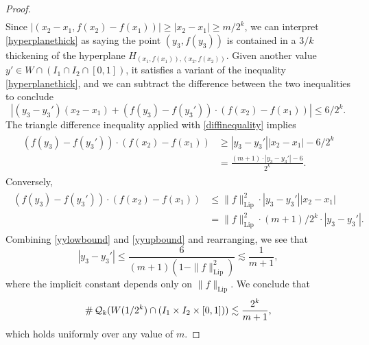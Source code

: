 \begin{proof}
\begin{align}
	\end{align}
	Since $|(x_2-x_1,f(x_2)-f(x_1))| \geq |x_2-x_1| \geq m/2^k$, we can interpret \eqref{hyperplanethick} as saying the point $(y_3, f(y_3))$ is contained in a $3/k$ thickening of the hyperplane $H_{(x_1,f(x_1)), (x_2,f(x_2))}$. Given another value $y' \in W \cap (I_1 \cap I_2 \cap [0,1])$, it satisfies a variant of the inequality \eqref{hyperplanethick}, and we can subtract the difference between the two inequalities to conclude
	\begin{equation} \label{diffinequality}
		\left| \left( y_3 - y_3' \right) (x_2 - x_1) + (f(y_3) - f(y_3')) \cdot (f(x_2) - f(x_1)) \right| \leq 6/2^k.
	\end{equation}
	The triangle difference inequality applied with \eqref{diffinequality} implies
	\begin{align} \label{yylowbound}
	\begin{split}
		(f(y_3) - f(y_3')) \cdot (f(x_2) - f(x_1)) &\geq |y_3 - y_3'||x_2-x_1| - 6/2^k\\ &= \frac{(m+1) \cdot |y_3 - y_3'| - 6}{2^k}.
	\end{split}
	\end{align}
	Conversely,
	\begin{align} \label{yyupbound}
	\begin{split}
		(f(y_3) - f(y_3')) \cdot (f(x_2) - f(x_1)) &\leq \| f \|_{\text{Lip}}^2 \cdot |y_3 - y_3'| |x_2 - x_1| \\ &=  \| f \|_{\text{Lip}}^2 \cdot (m+1)/2^k \cdot |y_3 - y_3'|.
	\end{split}
	\end{align}
	Combining \eqref{yylowbound} and \eqref{yyupbound} and rearranging, we see that
	\begin{equation}\label{y3minusY3Prime}
		|y_3 - y_3'| \leq \frac{6}{(m+1)(1 - \| f \|_{\text{Lip}}^2)}  \lesssim\frac{1}{m+1},
	\end{equation} 
	where the implicit constant depends only on $\| f \|_{\text{Lip}}$.  We conclude that
	\begin{equation}\label{coveringNumberBoundLargeK}
		\# \operatorname{\mathcal{Q}}_k(W(1/2^k) \cap (I_1 \times I_2 \times [0,1])) \lesssim \frac{2^k}{m+1},
	\end{equation} 
	which holds uniformly over any value of $m$.


\end{proof}
